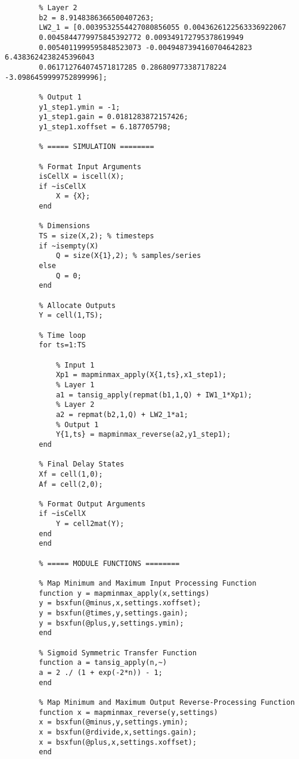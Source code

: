 \begin{apendicesenv}
\begin{verbatim}
        % Layer 2
        b2 = 8.9148386366500407263;
        LW2_1 = [0.0039532554427080856055 0.0043626122563336922067 
        0.0045844779975845392772 0.009349172795378619949
        0.0054011999595848523073 -0.0049487394160704642823 6.4383624238245396043 
        0.061712764074571817285 0.286809773387178224 -3.0986459999752899996];
        
        % Output 1
        y1_step1.ymin = -1;
        y1_step1.gain = 0.0181283872157426;
        y1_step1.xoffset = 6.187705798;
        
        % ===== SIMULATION ========
        
        % Format Input Arguments
        isCellX = iscell(X);
        if ~isCellX
            X = {X};
        end
        
        % Dimensions
        TS = size(X,2); % timesteps
        if ~isempty(X)
            Q = size(X{1},2); % samples/series
        else
            Q = 0;
        end
        
        % Allocate Outputs
        Y = cell(1,TS);
        
        % Time loop
        for ts=1:TS
            
            % Input 1
            Xp1 = mapminmax_apply(X{1,ts},x1_step1);
            % Layer 1
            a1 = tansig_apply(repmat(b1,1,Q) + IW1_1*Xp1);
            % Layer 2
            a2 = repmat(b2,1,Q) + LW2_1*a1;
            % Output 1
            Y{1,ts} = mapminmax_reverse(a2,y1_step1);
        end
        
        % Final Delay States
        Xf = cell(1,0);
        Af = cell(2,0);
        
        % Format Output Arguments
        if ~isCellX
            Y = cell2mat(Y);
        end
        end
        
        % ===== MODULE FUNCTIONS ========
        
        % Map Minimum and Maximum Input Processing Function
        function y = mapminmax_apply(x,settings)
        y = bsxfun(@minus,x,settings.xoffset);
        y = bsxfun(@times,y,settings.gain);
        y = bsxfun(@plus,y,settings.ymin);
        end
        
        % Sigmoid Symmetric Transfer Function
        function a = tansig_apply(n,~)
        a = 2 ./ (1 + exp(-2*n)) - 1;
        end
        
        % Map Minimum and Maximum Output Reverse-Processing Function
        function x = mapminmax_reverse(y,settings)
        x = bsxfun(@minus,y,settings.ymin);
        x = bsxfun(@rdivide,x,settings.gain);
        x = bsxfun(@plus,x,settings.xoffset);
        end

\end{verbatim}
\end{apendicesenv}
